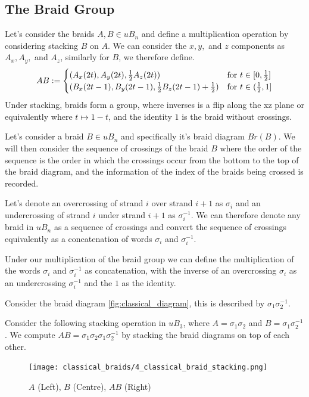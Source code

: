 \subsection{The Braid Group}

Let's consider the braids \( A, B \in uB_n \) and define a multiplication operation by considering stacking \( B \) on \( A \).
We can consider the \(x, y, \) and \( z \) components as \( A_x, A_y, \) and \( A_z \), similarly for \( B \), we therefore define. 
\[ 
AB := 
\begin{cases}
    (A_x(2t), A_y(2t), \frac{1}{2}A_z(2t)) &\text{for \( t \in [0, \frac{1}{2}]\)} \\
    (B_x(2t - 1), B_y(2t - 1) , \frac{1}{2}B_z(2t - 1) + \frac{1}{2}) &\text{for \( t \in (\frac{1}{2}, 1]\)} \\
\end{cases}
\]
Under stacking, braids form a group, where inverses is a flip along the xz plane or equivalently where \( t \mapsto 1 - t \), and the identity \( 1 \) is the braid without crossings. 

Let's consider a braid \( B \in uB_n \) and specifically it's braid diagram \( Br(B) \). 
We will then consider the sequence of crossings of the braid \( B \) where the order of the sequence is the order in which the crossings occur from the bottom to the top of the braid diagram, and the information of the index of the braids being crossed is recorded. 

Let's denote an overcrossing of strand \( i \) over strand \( i + 1 \) as \( \sigma_i \) and an undercrossing of strand \( i \) under strand \( i + 1 \) as \( \sigma_i^{-1} \). 
We can therefore denote any braid in \( uB_n \) as a sequence of crossings and convert the sequence of crossings equivalently as a concatenation of words \( \sigma_i \) and \( \sigma_i^{-1} \). 

Under our multiplication of the braid group we can define the multiplication of the words \( \sigma_i \) and \( \sigma_i^{-1} \) as concatenation, with the inverse of an overcrossing \( \sigma_i \) as an undercrossing \( \sigma_i^{-1} \) and the \( 1 \) as the identity. 

\begin{Example}
    Consider the braid diagram \cref{fig:classical_diagram}, this is described by \( \sigma_1 \sigma_2^{-1} \). 
\end{Example}

\begin{Example} \label{ex:stacking}
Consider the following stacking operation in \( uB_3 \), where \( A = \sigma_1 \sigma_2 \) and \( B = \sigma_1 \sigma_2^{-1} \). 
We compute \( AB = \sigma_1\sigma_2\sigma_1\sigma_2^{-1} \) by stacking the braid diagrams on top of each other. 

\begin{figure}[H]
    \centering
    \texttt{[image: classical\_braids/4\_classical\_braid\_stacking.png]}
    \caption{\( A \) (Left), \( B \) (Centre), \( AB \) (Right)}
\end{figure}

\end{Example}

